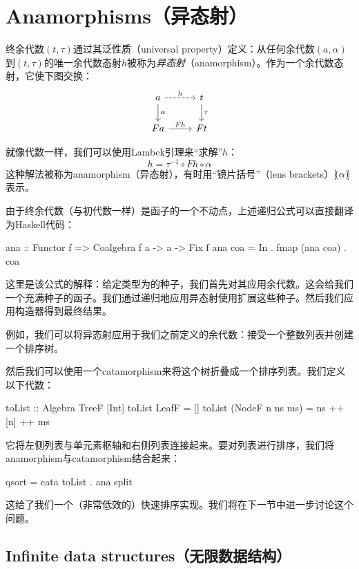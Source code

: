 \documentclass[DaoFP]{subfiles}
\begin{document}
    \section{Anamorphisms（异态射）}

    终余代数$(t, \tau)$通过其泛性质（universal property）定义：从任何余代数$(a, \alpha)$到$(t, \tau)$的唯一余代数态射$h$被称为\emph{异态射}（anamorphism）。作为一个余代数态射，它使下图交换：
    \[
        \begin{tikzcd}
            a
            \arrow[r, dashed, "h"]
            \arrow[d, "\alpha"]
            & t
            \arrow[d, "\tau"]
            \\
            F a
            \arrow[r,  "F h"]
            & F t
        \end{tikzcd}
    \]

    就像代数一样，我们可以使用Lambek引理来“求解”$h$：
    \[ h = \tau^{-1} \circ F h \circ \alpha \]
    这种解法被称为anamorphism（异态射），有时用“镜片括号”（lens brackets）$\mathopen{[\!(} \alpha \mathclose{)\!]}$表示。

    由于终余代数（与初代数一样）是函子的一个不动点，上述递归公式可以直接翻译为Haskell代码：
    \begin{haskell}
        ana :: Functor f => Coalgebra f a -> a -> Fix f
        ana coa = In . fmap (ana coa) . coa
    \end{haskell}
    这里是该公式的解释：给定类型为的种子，我们首先对其应用余代数。这会给我们一个充满种子的函子。我们通过递归地应用异态射使用扩展这些种子。然后我们应用构造器得到最终结果。

    例如，我们可以将异态射应用于我们之前定义的余代数：接受一个整数列表并创建一个排序树。

    然后我们可以使用一个catamorphism来将这个树折叠成一个排序列表。我们定义以下代数：
    \begin{haskell}
        toList :: Algebra TreeF [Int]
        toList LeafF = []
        toList (NodeF n ns ms) = ns ++ [n] ++ ms
    \end{haskell}
    它将左侧列表与单元素枢轴和右侧列表连接起来。要对列表进行排序，我们将anamorphism与catamorphism结合起来：
    \begin{haskell}
        qsort = cata toList . ana split
    \end{haskell}
    这给了我们一个（非常低效的）快速排序实现。我们将在下一节中进一步讨论这个问题。

    \subsection{Infinite data structures（无限数据结构）}
\end{document}
